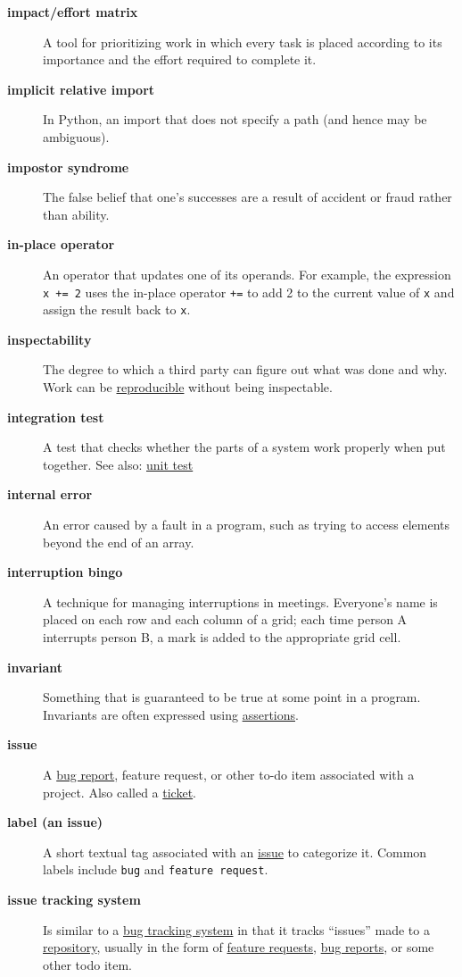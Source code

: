 \documentclass[
]{krantz}
\begin{document}
\begin{description}
\item[\textbf{impact/effort matrix}]
A tool for prioritizing work in which every task is placed according to its importance and the effort required to complete it.
\item[\textbf{implicit relative import}]
In Python, an import that does not specify a path (and hence may be ambiguous).
\item[\textbf{impostor syndrome}]
The false belief that one's successes are a result of accident or fraud rather than ability.
\item[\textbf{in-place operator}]
An operator that updates one of its operands. For example, the expression \texttt{x\ +=\ 2} uses the in-place operator \texttt{+=} to add 2 to the current value of \texttt{x} and assign the result back to \texttt{x}.
\item[\textbf{inspectability}]
The degree to which a third party can figure out what was done and why. Work can be \protect\hyperlink{reproducibility}{reproducible} without being inspectable.
\item[\textbf{integration test}]
A test that checks whether the parts of a system work properly when put together. See also: \protect\hyperlink{unit_test}{unit test}
\item[\textbf{internal error}]
An error caused by a fault in a program, such as trying to access elements beyond the end of an array.
\item[\textbf{interruption bingo}]
A technique for managing interruptions in meetings. Everyone's name is placed on each row and each column of a grid; each time person A interrupts person B, a mark is added to the appropriate grid cell.
\item[\textbf{invariant}]
Something that is guaranteed to be true at some point in a program. Invariants are often expressed using \protect\hyperlink{assertion}{assertions}.
\item[\textbf{issue}]
A \protect\hyperlink{bug_report}{bug report}, feature request, or other to-do item associated with a project. Also called a \protect\hyperlink{ticket}{ticket}.
\item[\textbf{label (an issue)}]
A short textual tag associated with an \protect\hyperlink{issue}{issue} to categorize it. Common labels include \texttt{bug} and \texttt{feature\ request}.
\item[\textbf{issue tracking system}]
Is similar to a \protect\hyperlink{bug_tracker}{bug tracking system} in that it tracks ``issues'' made to a \protect\hyperlink{repository}{repository}, usually in the form of \protect\hyperlink{feature_request}{feature requests}, \protect\hyperlink{bug_report}{bug reports}, or some other todo item.

\end{description}
\end{document}
